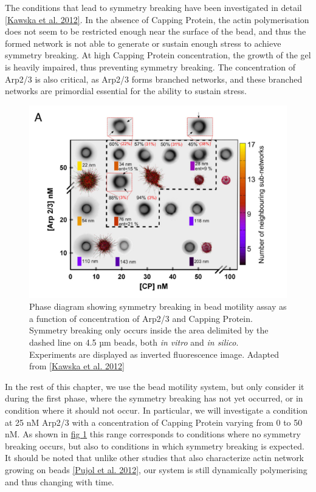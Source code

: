 \documentclass[A4paperpaper,11pt,english]{sphinxmanual}
\begin{document}
The conditions that lead to symmetry breaking have been investigated in detail
{\hyperref[index-latex:kawska2012]{{[}Kawska et al. 2012{]}}}. In the absence of Capping Protein, the actin polymerisation
does not seem to be restricted enough near the surface of the bead, and thus the formed
network is not able to generate or sustain enough stress to achieve symmetry
breaking. At high Capping Protein concentration, the growth of the gel is heavily impaired,
thus preventing symmetry breaking. The concentration of Arp2/3 is also critical,
as Arp2/3 forms branched networks, and these branched networks are primordial essential for the
ability to sustain stress.
\begin{figure}[htbp]
\centering
\capstart

\includegraphics[width=0.700\linewidth]{symmetry-breaking-phase-diagram.png}
\caption{Phase diagram showing symmetry breaking in bead motility assay as a
function of concentration of Arp2/3 and Capping Protein. Symmetry breaking
only occurs inside the area delimited by the dashed line on 4.5 µm beads, both
\emph{in vitro} and \emph{in silico}. Experiments are
displayed as inverted fluorescence image. Adapted from {\hyperref[index-latex:kawska2012]{{[}Kawska et al. 2012{]}}}}\label{index-latex:phase-diag}\end{figure}

In the rest of this chapter, we use the bead motility system, but only
consider it during the first phase, where the symmetry breaking has not yet
occurred, or in condition where it should not occur. In particular, we will
investigate a condition at 25 nM Arp2/3 with a concentration of Capping Protein
varying from 0 to 50 nM. As shown in \hyperref[index-latex:phase-diag]{fig  \ref*{index-latex:phase-diag}} this range corresponds to
conditions where no symmetry breaking occurs, but also to conditions in which
symmetry breaking is expected.  It should be noted that unlike
other studies that also characterize actin network growing on beads
{\hyperref[index-latex:pujol2012]{{[}Pujol et al. 2012{]}}}, our system is still dynamically polymerising and thus
changing with time.
\end{document}

